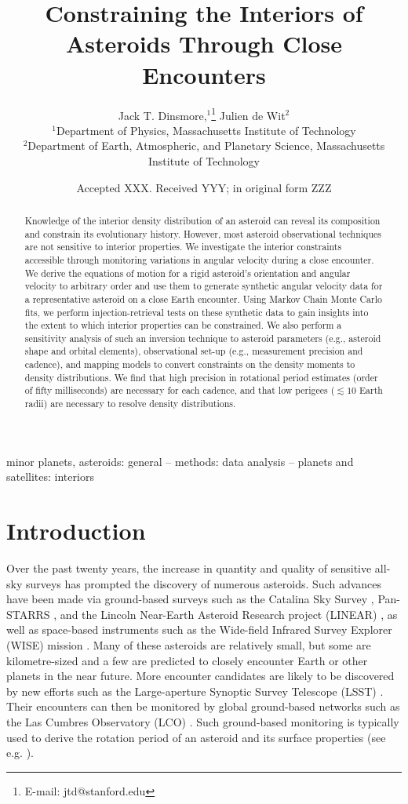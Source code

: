 \documentclass[fleqn,usenatbib]{mnras}
\title[Flyby Constraints on Asteroids Interiors]{Constraining the Interiors of Asteroids Through Close Encounters}
\author[Jack T. Dinsmore, Julien de Wit]{
Jack T. Dinsmore,$^{1}$\thanks{E-mail: jtd@stanford.edu}
Julien de Wit$^{2}$
\\
$^{1}$Department of Physics, Massachusetts Institute of Technology\\
$^{2}$Department of Earth, Atmospheric, and Planetary Science, Massachusetts Institute of Technology
}
\date{Accepted XXX. Received YYY; in original form ZZZ}
\begin{document}
\label{firstpage}
\pagerange{\pageref{firstpage}--\pageref{lastpage}}
\maketitle

\begin{abstract}
  Knowledge of the interior density distribution of an asteroid can reveal its composition and constrain its evolutionary history. However, most asteroid observational techniques are not sensitive to interior properties. We investigate the interior constraints accessible through monitoring variations in angular velocity during a close encounter. We derive the equations of motion for a rigid asteroid's orientation and angular velocity to arbitrary order and use them to generate synthetic angular velocity data for a representative asteroid on a close Earth encounter. Using Markov Chain Monte Carlo fits, we perform injection-retrieval tests on these synthetic data to gain insights into the extent to which interior properties can be constrained. We also perform a sensitivity analysis of such an inversion technique to asteroid parameters (e.g., asteroid shape and orbital elements), observational set-up (e.g., measurement precision and cadence), and mapping models to convert constraints on the density moments to density distributions. We find that high precision in rotational period estimates (order of fifty milliseconds) are necessary for each cadence, and that low perigees ($\lesssim 10$ Earth radii) are necessary to resolve density distributions.
\end{abstract}

\begin{keywords}
  minor planets, asteroids: general -- methods: data analysis -- planets and satellites: interiors
\end{keywords}


\section{Introduction}

Over the past twenty years, the increase in quantity and quality of sensitive all-sky surveys has prompted the discovery of numerous asteroids. Such advances have been made via ground-based surveys such as the Catalina Sky Survey \citep{larson1998catalina}, Pan-STARRS \citep{kaiser2002pan}, and the Lincoln Near-Earth Asteroid Research project (LINEAR) \citep{stokes2000lincoln}, as well as space-based instruments such as the Wide-field Infrared Survey Explorer (WISE) mission \citep{wright2010wide}. Many of these asteroids are relatively small, but some are kilometre-sized and a few are predicted to closely encounter Earth or other planets in the near future. More encounter candidates are likely to be discovered by new efforts such as the Large-aperture Synoptic Survey Telescope (LSST) \citep{tyson2002large}. Their encounters can then be monitored by global ground-based networks such as the Las Cumbres Observatory (LCO) \citep{brown2013cumbres}. Such ground-based monitoring is typically used to derive the rotation period of an asteroid and its surface properties (see e.g. \cite{10.1093/mnras/stab1252}).
\end{document}
